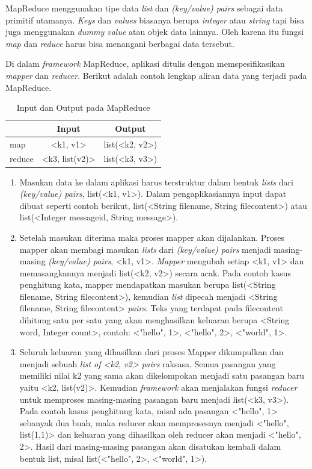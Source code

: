 MapReduce menggunakan tipe data \textit{list} dan \textit{(key/value) pairs} sebagai data primitif utamanya. \textit{Keys} dan \textit{values} biasanya berupa \textit{integer} atau \textit{string} tapi bisa juga menggunakan \textit{dummy value} atau objek data lainnya. Oleh karena itu fungsi \textit{map} dan \textit{reduce} harus bisa menangani berbagai data tersebut.

Di dalam \textit{framework} MapReduce, aplikasi ditulis dengan memspesifikasikan \textit{mapper} dan \textit{reducer}. Berikut adalah contoh lengkap aliran data yang terjadi pada MapReduce.

\begin{table}[H]
	\centering
	\begin{tabular}{| l | c | c |}
		\hline
		 & Input & Output \\
	 	\hline
		map & <k1, v1> & list(<k2, v2>) \\
		reduce & <k3, list(v2)> & list(<k3, v3>) \\ 
		\hline
	\end{tabular}	
	\caption{Input dan Output pada MapReduce} \label{tab:mapreduce_process}
\end{table}	

\begin{enumerate}
	\item Masukan data ke dalam aplikasi harus terstruktur dalam bentuk \textit{lists} dari \textit{(key/value) pairs}, list(<k1, v1>). Dalam pengaplikasiannya input dapat dibuat seperti contoh berikut, list(<String filename, String filecontent>) atau list(<Integer messageid, String message>).
	\item Setelah masukan diterima maka proses mapper akan dijalankan. Proses mapper akan membagi masukan \textit{lists} dari \textit{(key/value) pairs} menjadi masing-masing \textit{(key/value) pairs}, <k1, v1>. \textit{Mapper} mengubah setiap <k1, v1> dan memasangkannya menjadi list(<k2, v2>) secara acak. Pada contoh kasus penghitung kata, mapper mendapatkan masukan berupa list(<String filename, String filecontent>), kemudian \textit{list} dipecah menjadi <String filename, String filecontent> \textit{pairs}. Teks yang terdapat pada filecontent dihitung satu per satu yang akan menghasilkan keluaran berupa <String word, Integer count>, contoh: <"hello", 1>, <"hello", 2>, <"world", 1>. 
	\item Seluruh keluaran yang dihasilkan dari proses Mapper dikumpulkan dan menjadi sebuah \textit{list of <k2, v2> pairs} raksasa. Semua pasangan yang memiliki nilai k2 yang sama akan dikelompokan menjadi satu pasangan baru yaitu <k2, list(v2)>. Kemudian \textit{framework} akan menjalakan fungsi \textit{reducer} untuk memproses masing-masing pasangan baru menjadi list(<k3, v3>). Pada contoh kasus penghitung kata, misal ada pasangan <"hello", 1> sebanyak dua buah, maka reducer akan memprosesnya menjadi <"hello", list(1,1)> dan keluaran yang dihasilkan oleh reducer akan menjadi <"hello", 2>. Hasil dari masing-masing pasangan akan disatukan kembali dalam bentuk list, misal list(<"hello", 2>, <"world", 1>).
\end{enumerate} 

